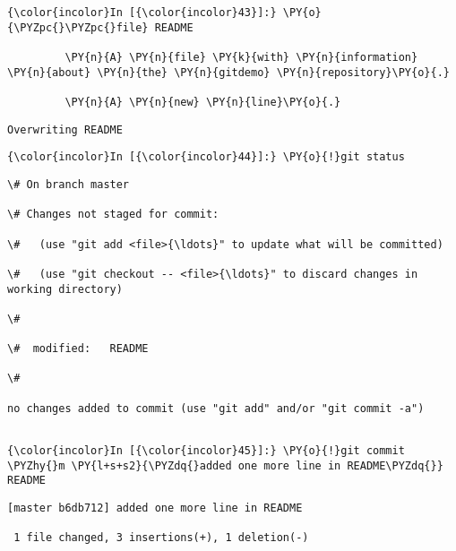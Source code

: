     \begin{Verbatim}[commandchars=\\\{\}]
{\color{incolor}In [{\color{incolor}43}]:} \PY{o}{\PYZpc{}\PYZpc{}file} README
         
         \PY{n}{A} \PY{n}{file} \PY{k}{with} \PY{n}{information} \PY{n}{about} \PY{n}{the} \PY{n}{gitdemo} \PY{n}{repository}\PY{o}{.}
         
         \PY{n}{A} \PY{n}{new} \PY{n}{line}\PY{o}{.}
\end{Verbatim}

    \begin{Verbatim}[commandchars=\\\{\}]
Overwriting README

    \end{Verbatim}

    \begin{Verbatim}[commandchars=\\\{\}]
{\color{incolor}In [{\color{incolor}44}]:} \PY{o}{!}git status
\end{Verbatim}

    \begin{Verbatim}[commandchars=\\\{\}]
\# On branch master

\# Changes not staged for commit:

\#   (use "git add <file>{\ldots}" to update what will be committed)

\#   (use "git checkout -- <file>{\ldots}" to discard changes in working directory)

\#

\#	modified:   README

\#

no changes added to commit (use "git add" and/or "git commit -a")


    \end{Verbatim}



    \begin{Verbatim}[commandchars=\\\{\}]
{\color{incolor}In [{\color{incolor}45}]:} \PY{o}{!}git commit \PYZhy{}m \PY{l+s+s2}{\PYZdq{}added one more line in README\PYZdq{}} README
\end{Verbatim}

    \begin{Verbatim}[commandchars=\\\{\}]
[master b6db712] added one more line in README

 1 file changed, 3 insertions(+), 1 deletion(-)


    \end{Verbatim}

